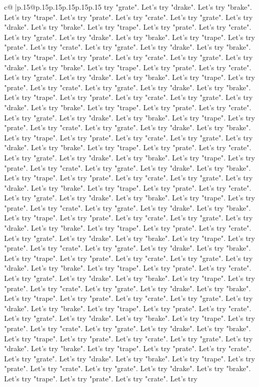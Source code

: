 \documentclass{article}
\begin{document}
{\begin{supertabular}{c@{$\;$}|p{.15\linewidth}@{}p{.15\linewidth}p{.15\linewidth}p{.15\linewidth}p{.15\linewidth}p{.15\linewidth}}
{{{try "grate". Let's try "drake". Let's try "brake". Let's try "trape". Let's try "prate". Let's try "crate". Let's try "grate". Let's try "drake". Let's try "brake". Let's try "trape". Let's try "prate". Let's try "crate". Let's try "grate". Let's try "drake". Let's try "brake". Let's try "trape". Let's try "prate". Let's try "crate". Let's try "grate". Let's try "drake". Let's try "brake". Let's try "trape". Let's try "prate". Let's try "crate". Let's try "grate". Let's try "drake". Let's try "brake". Let's try "trape". Let's try "prate". Let's try "crate". Let's try "grate". Let's try "drake". Let's try "brake". Let's try "trape". Let's try "prate". Let's try "crate". Let's try "grate". Let's try "drake". Let's try "brake". Let's try "trape". Let's try "prate". Let's try "crate". Let's try "grate". Let's try "drake". Let's try "brake". Let's try "trape". Let's try "prate". Let's try "crate". Let's try "grate". Let's try "drake". Let's try "brake". Let's try "trape". Let's try "prate". Let's try "crate". Let's try "grate". Let's try "drake". Let's try "brake". Let's try "trape". Let's try "prate". Let's try "crate". Let's try "grate". Let's try "drake". Let's try "brake". Let's try "trape". Let's try "prate". Let's try "crate". Let's try "grate". Let's try "drake". Let's try "brake". Let's try "trape". Let's try "prate". Let's try "crate". Let's try "grate". Let's try "drake". Let's try "brake". Let's try "trape". Let's try "prate". Let's try "crate". Let's try "grate". Let's try "drake". Let's try "brake". Let's try "trape". Let's try "prate". Let's try "crate". Let's try "grate". Let's try "drake". Let's try "brake". Let's try "trape". Let's try "prate". Let's try "crate". Let's try "grate". Let's try "drake". Let's try "brake". Let's try "trape". Let's try "prate". Let's try "crate". Let's try "grate". Let's try "drake". Let's try "brake". Let's try "trape". Let's try "prate". Let's try "crate". Let's try "grate". Let's try "drake". Let's try "brake". Let's try "trape". Let's try "prate". Let's try "crate". Let's try "grate". Let's try "drake". Let's try "brake". Let's try "trape". Let's try "prate". Let's try "crate". Let's try "grate". Let's try "drake". Let's try "brake". Let's try "trape". Let's try "prate". Let's try "crate". Let's try "grate". Let's try "drake". Let's try "brake". Let's try "trape". Let's try "prate". Let's try "crate". Let's try "grate". Let's try "drake". Let's try "brake". Let's try "trape". Let's try "prate". Let's try "crate". Let's try "grate". Let's try "drake". Let's try "brake". Let's try "trape". Let's try "prate". Let's try "crate". Let's try "grate". Let's try "drake". Let's try "brake". Let's try "trape". Let's try "prate". Let's try "crate". Let's try "grate". Let's try "drake". Let's try "brake". Let's try "trape". Let's try "prate". Let's try "crate". Let's try "grate". Let's try "drake". Let's try "brake". Let's try "trape". Let's try "prate". Let's try "crate". Let's try "grate". Let's try "drake". Let's try "brake". Let's try "trape". Let's try "prate". Let's try "crate". Let's try "grate". Let's try "drake". Let's try "brake". Let's try "trape". Let's try "prate". Let's try "crate". Let's try }}}
\end{supertabular}}
\end{document}
